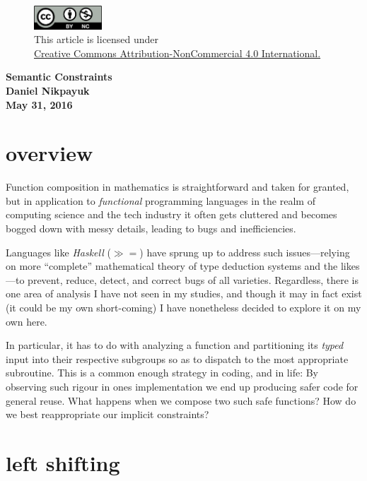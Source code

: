 \documentclass[twoside]{article}
\begin{document}
\begin{figure}[h]
\centering
\includegraphics[width=1in]{../../../cc-by-nc.png}\\[0.1in]
\tiny This article is licensed under \\
\href{http://creativecommons.org/licenses/by-nc/4.0/}
{Creative Commons Attribution-NonCommercial 4.0 International.}\\[0.3in]
\end{figure}

\begin{center}
\bfseries\Large Semantic Constraints\\ \normalsize Daniel Nikpayuk \\ May 31, 2016
\end{center}

\section*{overview}

Function composition in mathematics is straightforward and taken for granted, but in application
to \emph{functional} programming languages in the realm of computing science and the tech industry
it often gets cluttered and becomes bogged down with messy details, leading to bugs and inefficiencies.

Languages like \emph{Haskell} ($ \gg = $) have sprung up to address such issues---relying on more ``complete''
mathematical theory of type deduction systems and the likes---to prevent, reduce, detect, and correct bugs of
all varieties.  Regardless, there is one area of analysis I have not seen in my studies, and though it may in
fact exist (it could be my own short-coming) I have nonetheless decided to explore it on my own here.

In particular, it has to do with analyzing a function and partitioning its \emph{typed} input into their
respective subgroups so as to dispatch to the most appropriate subroutine. This is a common enough strategy
in coding, and in life: By observing such rigour in ones implementation we end up producing safer code for general
reuse. What happens when we compose two such safe functions? How do we best reappropriate our implicit constraints?

\section*{left shifting}
\end{document}
